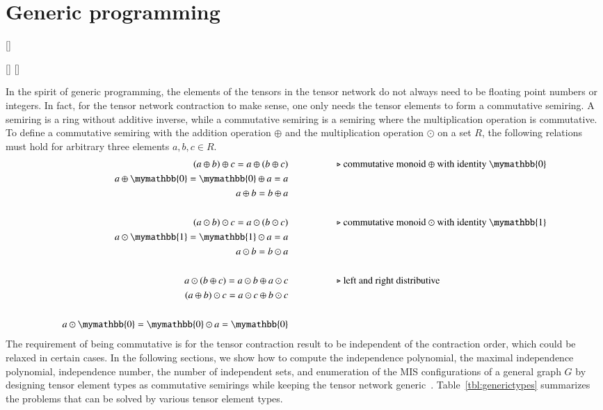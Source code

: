\documentclass[onefignum, onetabnum]{siamart190516}
\newcommand{\<}{\langle}
\renewcommand{\>}{\rangle}
\newcommand{\red}[1]{[{\bf  \color{red}{ST: #1}}]}
\begin{document}
\section{Generic programming}\label{sec:generic}
\red{I suggest we have a section on generic programming, putting both the semiring stuff and the summary table to this section, since generic programming is one of the highlights of this paper as well. I think it doesn't need to be long. Jinguo, could you write one or two paragraphs introducing generic programming?}

\red{Generic programming is ...}
\red{dispatch to different types etc. ...} 

In the spirit of generic programming, the elements of the tensors in the tensor network do not always need to be floating point numbers or integers. In fact, for the tensor network contraction to make sense, one only needs the tensor elements to form a commutative semiring. A semiring is a ring without additive inverse, while a commutative semiring is a semiring where the multiplication operation is commutative. To define a commutative semiring with the addition operation $\oplus$ and the multiplication operation $\odot$ on a set $R$, the following relations must hold for arbitrary three elements $a, b, c \in R$.
\begin{align*}
(a \oplus b) \oplus c = a \oplus (b \oplus c) & \hspace{5em}\text{$\triangleright$ commutative monoid $\oplus$ with identity $\mymathbb{0}$}\\
a \oplus \mymathbb{0} = \mymathbb{0} \oplus a = a &\\
a \oplus b = b \oplus a &\\
&\\
(a \odot b) \odot c = a \odot (b \odot c)  &   \hspace{5em}\text{$\triangleright$ commutative monoid $\odot$ with identity $\mymathbb{1}$}\\
a \odot  \mymathbb{1} =  \mymathbb{1} \odot a = a &\\
a \odot b = b \odot a &\\
&\\
a \odot (b\oplus c) = a\odot b \oplus a\odot c  &  \hspace{5em}\text{$\triangleright$ left and right distributive}\\
(a\oplus b) \odot c = a\odot c \oplus b\odot c &\\
&\\
a \odot \mymathbb{0} = \mymathbb{0} \odot a = \mymathbb{0}
\end{align*}
The requirement of being commutative is for the tensor contraction result to be independent of the contraction order, which could be relaxed in certain cases. In the following sections, we show how to compute the independence polynomial, the maximal independence polynomial, independence number, the number of independent sets, and enumeration of the MIS configurations of a general graph $G$ by designing tensor element types as commutative semirings while keeping the tensor network generic~\cite{Stepanov2014}. Table~\ref{tbl:generictypes} summarizes the problems that can be solved by various tensor element types. 
\end{document}
